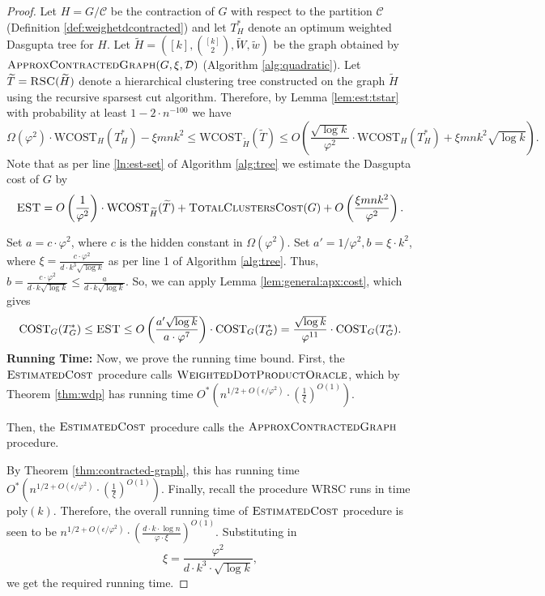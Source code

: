 \documentclass[letterpaper,11pt]{article}
\newcommand{\CT}{\text{COST}}
\newcommand{\wCT}{\text{WCOST}}
\newcommand{\est}{O\left(\frac{1}{\varphi^2}\right)\cdot  \wCT_{\wt{H}}(\wt{T}) + \textsc{TotalClustersCost}(G)+ O\left(\frac{\xi m n k^2 }{\varphi^2} \right) }
\newcommand{\estg}{\textsc{EST}}
\newcommand{\cC}{\mathcal{C}}
\theoremstyle{plain}
\theoremstyle{definition}
\theoremstyle{remark}
\newcommand{\e}{\epsilon}
\newcommand{\wt}[1]{\widetilde{#1}}
\begin{document}
\begin{proof}
Let $H = G/\cC$ be the contraction of $G$ with respect to the partition $\cC $ (Definition \ref{def:weighetdcontracted}) and  let $T^*_H$ denote an optimum weighted Dasgupta tree for $H$. Let $\widetilde{H}=\left([k], {[k] \choose 2}, \widetilde{W}, \widetilde{w} \right)$ be the graph obtained by 
	$\textsc{ApproxContractedGraph}(G, \xi, \mathcal{D})$ (Algorithm \ref{alg:quadratic}). Let $\widetilde{T} = \textsc{RSC}(\widetilde{H})$ denote a hierarchical clustering tree constructed on the graph $\widetilde{H}$ using the recursive sparsest cut algorithm. Therefore, by Lemma \ref{lem:est:tstar} with probability at least $ 1-2\cdot n^{-100}$ we have
	\begin{equation}
\label{eq:est:tstar}
	\Omega(\varphi^2)\cdot \wCT_{H}(T^*_{H}) - \xi m n k^2   \leq \wCT_{\wt{H}}(\widetilde{T}) \leq O\left( \frac{\sqrt{\log k}}{\varphi^2}\cdot \wCT_{H}(T^*_{H}) + \xi  m n k^2 \sqrt{\log k} \right).
	\end{equation}
	Note that as per line \eqref{ln:est-set} of Algorithm \ref{alg:tree} we estimate the Dasgupta cost of $G$ by 
	\begin{equation}
	\label{eq:est-val}
	\estg = \est \text{.}
	\end{equation}

	Set $a = c\cdot\varphi^2$, where $c$ is the hidden constant in $\Omega(\varphi^2)$. Set $a' = 1/\varphi^2, b=\xi\cdot k^2$,  where  $\xi = \frac{c\cdot \varphi^2}{d \cdot k^3 \sqrt{\log k}}$ as per line 1 of Algorithm \ref{alg:tree}.
	Thus, $b =  \frac{c\cdot \varphi^2}{d \cdot k \sqrt{\log k}} \leq \frac{a}{d \cdot k \sqrt{\log k}}$. So, we can apply Lemma \ref{lem:general:apx:cost}, which gives
	\[\CT_G(T^*_G) \leq \estg \leq O\left( \frac{a' \sqrt{ \log k}}{a\cdot \varphi^7} \right)\cdot  \CT_G(T^*_G)  = \frac{\sqrt{\log k}}{\varphi^{11}} \cdot \CT_G(T^*_G) \text{.}\]
\textbf{Running Time:} Now, we prove the running time bound. First, the $\textsc{EstimatedCost}$ procedure calls $\textsc{WeightedDotProductOracle}$, which by Theorem \ref{thm:wdp} has running time $O^*\left(n^{1/2+O(\e/\varphi^2)}\cdot \left(\frac{1}{\xi}\right)^{O(1)}\right)$. 

Then, the $\textsc{EstimatedCost}$ procedure calls the $\textsc{ApproxContractedGraph}$ 
	procedure. 
    
By Theorem \ref{thm:contracted-graph}, this has running time $O^*\left(n^{1/2+O(\e/\varphi^2)}\cdot \left( \frac{1}{\xi}\right)^{O(1)}\right)$. Finally, recall the procedure $\text{WRSC}$ runs in time $\text{poly}(k)$. 
Therefore, the overall running time of $\textsc{EstimatedCost}$ procedure is seen to be 
	${n^{1/2+O(\e/\varphi^2)} \cdot \left(\frac{d \cdot k \cdot \log n}{\varphi \cdot \xi}\right)^{O(1)}}$. 
    Substituting in 
    \[\xi = \frac{\varphi^2}{d\cdot  k^3 \cdot \sqrt{\log k}},\] we get the required running time. 


\end{proof}
\end{document}
